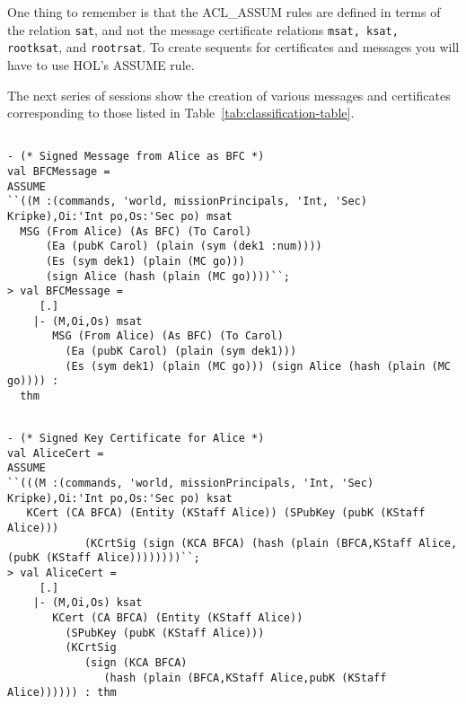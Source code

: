 \documentclass[10pt,twoside]{article}
\begin{document}
One thing to remember is that the ACL\_ASSUM rules are defined in
terms of the relation \texttt{sat}, and not the message certificate
relations \texttt{msat, ksat, rootksat}, and \texttt{rootrsat}.  To
create sequents for certificates and messages you will have to use
HOL's ASSUME rule.  

The next series of sessions show the creation of various messages and
certificates corresponding to those listed in
Table~\ref{tab:classification-table}.

\begin{session}
  \begin{scriptsize}
\begin{verbatim}

- (* Signed Message from Alice as BFC *)
val BFCMessage =
ASSUME
``((M :(commands, 'world, missionPrincipals, 'Int, 'Sec) Kripke),Oi:'Int po,Os:'Sec po) msat
  MSG (From Alice) (As BFC) (To Carol)
      (Ea (pubK Carol) (plain (sym (dek1 :num))))
      (Es (sym dek1) (plain (MC go)))
      (sign Alice (hash (plain (MC go))))``;
> val BFCMessage =
     [.]
    |- (M,Oi,Os) msat
       MSG (From Alice) (As BFC) (To Carol)
         (Ea (pubK Carol) (plain (sym dek1)))
         (Es (sym dek1) (plain (MC go))) (sign Alice (hash (plain (MC go)))) :
  thm
\end{verbatim}
  \end{scriptsize}
\end{session}

\begin{session}
  \begin{scriptsize}
\begin{verbatim}

- (* Signed Key Certificate for Alice *)
val AliceCert =
ASSUME
``(((M :(commands, 'world, missionPrincipals, 'Int, 'Sec) Kripke),Oi:'Int po,Os:'Sec po) ksat
   KCert (CA BFCA) (Entity (KStaff Alice)) (SPubKey (pubK (KStaff Alice)))
            (KCrtSig (sign (KCA BFCA) (hash (plain (BFCA,KStaff Alice,(pubK (KStaff Alice))))))))``;
> val AliceCert =
     [.]
    |- (M,Oi,Os) ksat
       KCert (CA BFCA) (Entity (KStaff Alice))
         (SPubKey (pubK (KStaff Alice)))
         (KCrtSig
            (sign (KCA BFCA)
               (hash (plain (BFCA,KStaff Alice,pubK (KStaff Alice)))))) : thm
\end{verbatim}
  \end{scriptsize}
\end{session}
\end{document}
